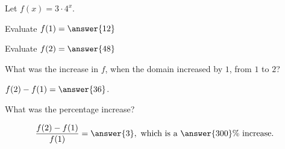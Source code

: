 \documentclass{ximera}
\author{Lee Wayand}
\begin{document}
\begin{exercise}




Let $f(x) = 3 \cdot 4^{x}$.


\begin{question}


Evaluate $f(1) = \answer{12}$


Evaluate $f(2) = \answer{48}$


What was the increase in $f$, when the domain increased by $1$, from $1$ to $2$?   

$f(2) - f(1) = \answer{36}$.


What was the percentage increase?   

\[
\frac{f(2) - f(1)}{f(1)} = \answer{3}, \text{ which is a } \answer{300}\% \text{ increase. }
\]

\end{question}















\end{exercise}
\end{document}
